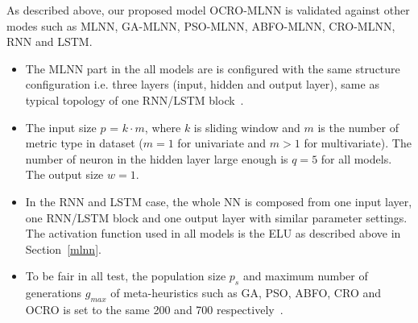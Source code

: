 \documentclass[review,3p,authoryear]{elsarticle}
\begin{document}
As described above, our proposed model OCRO-MLNN is validated against other modes such as MLNN, GA-MLNN, PSO-MLNN, ABFO-MLNN, CRO-MLNN, RNN and LSTM. 
\begin{itemize}

\item The MLNN part in the all models are is configured with the same structure configuration i.e. three layers (input, hidden and output layer), same as typical topology of one RNN/LSTM block~\citep{ref_xiaolei}. 

\item The input size $p$ = $k \cdot m$, where 
	$k$ is sliding window and 
	$m$ is the number of metric type in dataset ($m=1$ for univariate and $m>1$ for multivariate). 
	The number of neuron in the hidden layer large enough is $q=5$ for all models. 
The output size $w=1$. 

\item In the RNN and LSTM case, the whole NN is composed from 
one input layer, one RNN/LSTM block and one output layer with similar parameter settings. 
The activation function used in all models is the ELU as described above in Section~\ref{mlnn}.

\item To be fair in all test, the population size $p_s$ and maximum number of generations $g_{max}$ of meta-heuristics such as GA, PSO, ABFO, CRO and OCRO is set to the same 200 and 700 respectively~\citep{ref_thieu}. 
\end{itemize}
\end{document}
